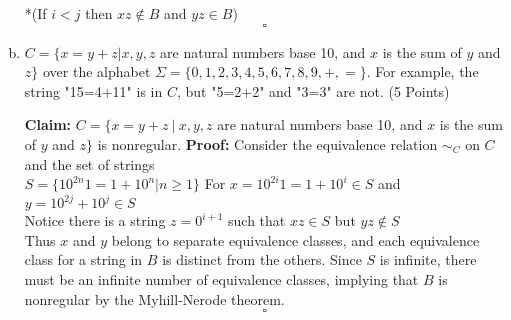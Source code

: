 \documentclass{article}
\begin{document}
\begin{enumerate}[(a)]
    *(If $i < j$ then $xz \notin B$ and $yz \in B$)\\
    \[ \square \]

\item $C = \{x=y+z | x,y,z$ are natural numbers base 10, and $x$ is the sum of $y$ and $z\}$
    over the alphabet $\Sigma = \{0,1,2,3,4,5,6,7,8,9,+,=\}$. For example, the string
    "15=4+11" is in $C$, but "5=2+2" and "3=3" are not. (5 Points)

\textbf{Claim:}
    $C = \{x=y+z\ |\ x,y,z$ are natural numbers base 10, and $x$ is the sum of $y$ and $z\}$
    is nonregular.
\textbf{Proof:}
    Consider the equivalence relation $\sim_C$ on $C$ and the set of strings \\
    $S = \{ 10^{2n}1 = 1+10^n | n \geq 1\}$
    For $x = 10^{2i}1 = 1 + 10^i \in S$ and $y = 10^{2j} + 10^j \in S$ \\
    Notice there is a string $z = 0^{i+1}$ such that $xz \in S$ but $yz \notin S$ \\
    Thus $x$ and $y$ belong to separate equivalence classes,
    and each equivalence class for a string in
    $B$ is distinct from the others. Since $S$ is infinite, there must be an infinite number of
    equivalence classes, implying that $B$ is nonregular by the Myhill-Nerode theorem.
    \[ \square \]


\end{enumerate}

\newpage
\end{document}
